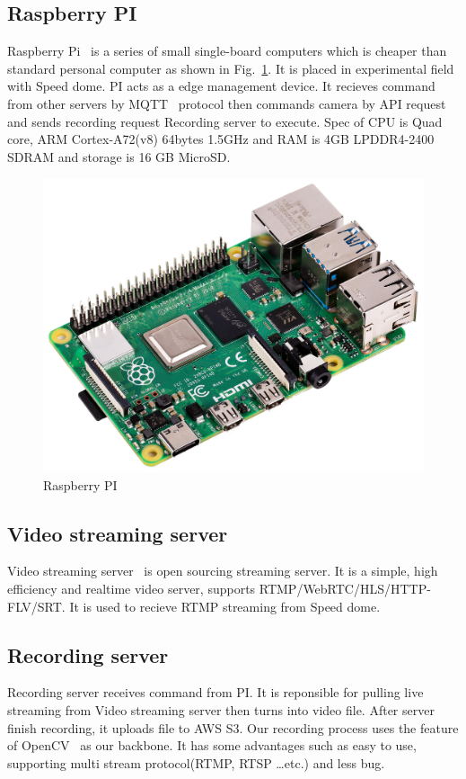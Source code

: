 \subsection{Raspberry PI}
Raspberry Pi~\cite{pi} is a series of small single-board computers which is cheaper than standard personal computer as shown in Fig.~\ref{fig:pi}. It is placed in experimental field with Speed dome. PI acts as a edge management device. It recieves command from other servers by MQTT~\cite{mqtt-intro} protocol then commands camera by API request and sends recording request Recording server to execute. Spec of CPU is Quad core, ARM Cortex-A72(v8) 64bytes 1.5GHz and RAM is 4GB LPDDR4-2400 SDRAM and storage is 16 GB MicroSD.

\begin{figure}[H]
    \centering
    \includegraphics[width=\textwidth]{figsrc/pi.jpeg}
    \caption{Raspberry PI\label{fig:pi}}
\end{figure}

\subsection{Video streaming server}
Video streaming server~\cite{ossr} is open sourcing streaming server. It is a simple, high efficiency and realtime video server, supports RTMP/WebRTC/HLS/HTTP-FLV/SRT. It is used to recieve RTMP streaming from Speed dome.

\subsection{Recording server}
Recording server receives command from PI. It is reponsible for pulling live streaming from Video streaming server then turns into video file. After server finish recording, it uploads file to AWS S3. Our recording process uses the feature of OpenCV~\cite{opencv} as our backbone. It has some advantages such as easy to use, supporting multi stream protocol(RTMP, RTSP …etc.) and less bug.

